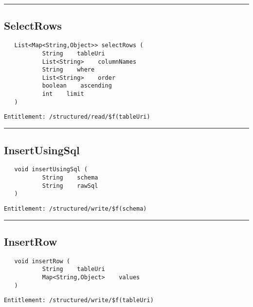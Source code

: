 \rule{12cm}{2pt}
\subsection{SelectRows}
\label{Api:SelectRows}
\begin{Verbatim}
   List<Map<String,Object>> selectRows (
           String    tableUri
           List<String>    columnNames
           String    where
           List<String>    order
           boolean    ascending
           int    limit
   )
\end{Verbatim}
\begin{Verbatim}[formatcom=\color{Maroon}]
  Entitlement: /structured/read/$f(tableUri)
\end{Verbatim}



\rule{12cm}{2pt}
\subsection{InsertUsingSql}
\label{Api:InsertUsingSql}
\begin{Verbatim}
   void insertUsingSql (
           String    schema
           String    rawSql
   )
\end{Verbatim}
\begin{Verbatim}[formatcom=\color{Maroon}]
  Entitlement: /structured/write/$f(schema)
\end{Verbatim}



\rule{12cm}{2pt}
\subsection{InsertRow}
\label{Api:InsertRow}
\begin{Verbatim}
   void insertRow (
           String    tableUri
           Map<String,Object>    values
   )
\end{Verbatim}
\begin{Verbatim}[formatcom=\color{Maroon}]
  Entitlement: /structured/write/$f(tableUri)
\end{Verbatim}



